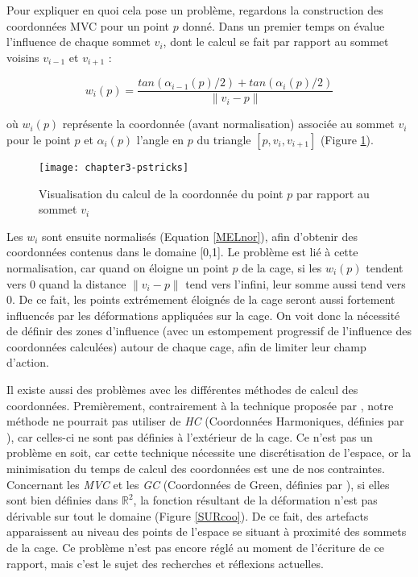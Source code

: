 Pour expliquer en quoi cela pose un problème, regardons la
construction des coordonnées MVC pour un point $p$ donné. Dans un
premier temps on évalue l'influence de chaque sommet $v_i$, dont le
calcul se fait par rapport au sommet voisins $v_{i-1}$ et $v_{i+1}$ :

\begin{equation}
  w_i(p) = \frac{tan(\alpha_{i-1}(p)/2) + tan(\alpha_{i}(p)/2)}{\|v_i - p\|}
\end{equation}

où $w_i(p)$ représente la coordonnée (avant normalisation) associée au
sommet $v_i$ pour le point $p$ et $\alpha_i(p)$ l'angle en $p$ du
triangle $[p,v_i,v_{i+1}]$ (Figure \ref{MELmvc}).

\begin{figure}[ht]
  \begin{center}
    \texttt{[image: chapter3-pstricks]}
    \caption{Visualisation du calcul de la coordonnée du point $p$ par
      rapport au sommet $v_i$}
    \label{MELmvc}
  \end{center}
\end{figure}

Les $w_i$ sont ensuite normalisés (Equation \ref{MELnor}), afin
d'obtenir des coordonnées contenus dans le domaine [0,1]. Le problème
est lié à cette normalisation, car quand on éloigne un point $p$ de la
cage, si les $w_i(p)$ tendent vers 0 quand la distance $\|v_i - p\|$
tend vers l'infini, leur somme aussi tend vers 0. De ce fait, les
points extrémement éloignés de la cage seront aussi fortement
influencés par les déformations appliquées sur la cage. On voit donc
la nécessité de définir des zones d'influence (avec un estompement
progressif de l'influence des coordonnées calculées) autour de chaque
cage, afin de limiter leur champ d'action.

Il existe aussi des problèmes avec les différentes méthodes de calcul
des coordonnées. Premièrement, contrairement à la technique proposée
par \cite{GPCP13}, notre méthode ne pourrait pas utiliser de
\textit{HC} (Coordonnées Harmoniques, définies par \cite{JMDGS07}),
car celles-ci ne sont pas définies à l'extérieur de la cage. Ce n'est
pas un problème en soit, car cette technique nécessite une
discrétisation de l'espace, or la minimisation du temps de calcul des coordonnées est
une de nos contraintes. Concernant les \textit{MVC} et les \textit{GC}
(Coordonnées de Green, définies par \cite{LLC08}), si elles sont bien
définies dans $\mathbb{R}^2$, la fonction résultant de la déformation
n'est pas dérivable sur tout le domaine (Figure \ref{SURcoo}). De ce
fait, des artefacts apparaissent au niveau des points de l'espace se
situant à proximité des sommets de la cage. Ce problème n'est pas
encore réglé au moment de l'écriture de ce rapport, mais c'est le
sujet des recherches et réflexions actuelles.

